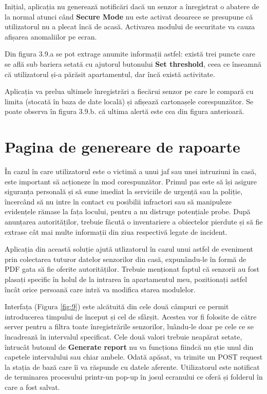 Inițial, aplicația nu generează notificări dacă un senzor a înregistrat o abatere de la normal atunci când \textbf{Secure Mode} nu este activat deoarece se presupune că utilizatorul nu a plecat încă de acasă. Activarea modului de securitate va cauza afișarea anomaliilor pe ecran.

Din figura 3.9.a se pot extrage anumite informații astfel: există trei puncte care se află sub bariera setată cu ajutorul butonului \textbf{Set threshold}, ceea ce înseamnă că utilizatorul și-a părăsit apartamentul, dar încă există activitate. 

Aplicația va prelua ultimele înregistrări a fiecărui senzor pe care le compară cu limita (stocată în baza de date locală) și afișează cartonașele corespunzător. Se poate observa în figura 3.9.b. că ultima alertă este cea din figura anterioară.

\break

\section{Pagina de genereare de rapoarte}

În cazul în care utilizatorul este o victimă a unui jaf sau unei intruziuni în casă, este important să acționeze în mod corespunzător. Primul pas este să își asigure siguranța personală și să sune imediat la serviciile de urgență sau la poliție, încercând să nu intre în contact cu posibilii infractori sau să manipuleze evidențele rămase la fața locului, pentru a nu distruge potențiale probe. După anunțarea autorităților, trebuie făcută o inventariere a obiectelor pierdute și să fie extrase cât mai multe informații din ziua respectivă legate de incident.

Aplicația din această soluție ajută utlizatorul în cazul unui astfel de eveniment prin colectarea tuturor datelor senzorilor din casă, expunându-le în formă de PDF gata să fie oferite autorităților. Trebuie menționat faptul că senzorii au fost plasați specific în holul de la intrarea în apartamentul meu, pozitionați astfel încât orice persoană care intră va modifica starea modulelor.

Interfața (Figura \ref{fig:9}) este alcătuită din cele două câmpuri ce permit introducerea timpului de început și cel de sfârșit. Acestea vor fi folosite de către server pentru a filtra toate înregistrările senzorilor, luându-le doar pe cele ce se încadrează în intervalul specificat. Cele două valori trebuie neapărat setate, întrucât butonul de \textbf{Generate report} nu va funcționa fiindcă nu știe unul din capetele intervalului sau chiar ambele. Odată apăsat, va trimite un POST request la stația de bază care îi va răspunde cu datele aferente. Utilizatorul este notificat de terminarea procesului printr-un pop-up în josul ecranului ce oferă și folderul în care a fost salvat.

